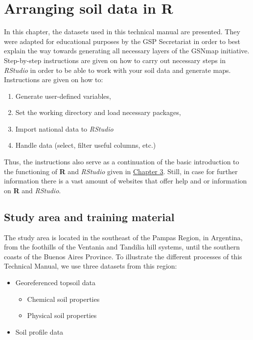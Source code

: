 \documentclass[
  10pt,
  b5paper,
  oneside]{book}
\providecommand{\tightlist}{%
  \setlength{\itemsep}{0pt}\setlength{\parskip}{0pt}}
\begin{document}
\hypertarget{arranging-soil-data-in-r}{%
\chapter{\texorpdfstring{Arranging soil data in \textbf{R}}{Arranging soil data in R}}\label{arranging-soil-data-in-r}}

In this chapter, the datasets used in this technical manual are presented. They were adapted for educational purposes by the GSP Secretariat in order to best explain the way towards generating all necessary layers of the GSNmap initiative.
Step-by-step instructions are given on how to carry out necessary steps in \emph{RStudio} in order to be able to work with your soil data and generate maps. Instructions are given on how to:

\begin{enumerate}
\def\labelenumi{\arabic{enumi}.}
\tightlist
\item
  Generate user-defined variables,
\item
  Set the working directory and load necessary packages,
\item
  Import national data to \emph{RStudio}
\item
  Handle data (select, filter useful columns, etc.)
\end{enumerate}

Thus, the instructions also serve as a continuation of the basic introduction to the functioning of \textbf{R} and \emph{RStudio} given in \href{https://fao-gsp.github.io/GSNmap-TM/setting-up-the-software-environment.html\#use-of-r-rstudio-and-r-packages}{Chapter 3}. Still, in case for further information there is a vast amount of websites that offer help and or information on \textbf{R} and \emph{RStudio}.

\hypertarget{study-area-and-training-material}{%
\section{Study area and training material}\label{study-area-and-training-material}}

The study area is located in the southeast of the Pampas Region, in Argentina, from the foothills of the Ventania and Tandilia hill systems, until the southern coasts of the Buenos Aires Province.
To illustrate the different processes of this Technical Manual, we use three datasets from this region:

\begin{itemize}
\tightlist
\item
  Georeferenced topsoil data

  \begin{itemize}
  \tightlist
  \item
    Chemical soil properties
  \item
    Physical soil properties
  \end{itemize}
\item
  Soil profile data
\end{itemize}
\end{document}

